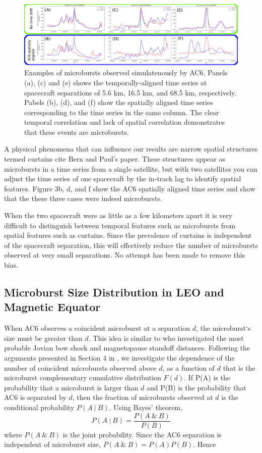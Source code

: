 \documentclass[draft]{agujournal2019}
\begin{document}
\begin{figure}
\includegraphics[width=\textwidth]{fig2.png}
\caption{Examples of microbursts observed simulatenously by AC6. Panels (a), (c) and (e) shows the temporally-aligned time series at spacecraft separations of 5.6 km, 16.5 km, and 68.5 km, respectively. Pabels (b), (d), and (f) show the spatially aligned time series corresponding to the time series in the same column. The clear temporal correlation and lack of spatial correlation demonstrates that these events are microbursts.} \label{fig2}
\end{figure}
	
A physical phenomena that can influence our results are narrow spatial structures termed curtains cite Bern and Paul’s paper. These structures appear as microbursts in a time series from a single satellite, but with two satellites you can adjust the time series of one spacecraft by the in-track lag to identify spatial features. Figure 3b, d, and f show the AC6 spatially aligned time series and show that the these three cases were indeed microbursts.  
	
When the two spacecraft were as little as a few kilometers apart it is very difficult to distinguish between temporal features such as microbursts from spatial features such as curtains. Since the prevalence of curtains is independent of the spacecraft separation, this will effectively reduce the number of microbursts observed at very small separations. No attempt has been made to remove this bias.

\subsection{Microburst Size Distribution in LEO and Magnetic Equator}
When AC6 observes a coincident microburst at a separation $d$, the microburst`s size must be greater than $d$. This idea is similar to  who investigated the most probable Jovian bow shock and magnetopause standoff distances. Following the arguments presented in Section 4 in , we investigate the dependence of the number of coincident microbursts observed above $d$, as a function of $d$ that is the microburst complementary cumulative distribution $F(d)$.  If P(A) is the probability that a microburst is larger than $d$ and P(B) is the probability that AC6 is separated by $d$, then the fraction of microbursts observed at $d$ is the conditional probability $P(A \ \vert \ B)$. Using Bayes’ theorem, 
\begin{equation}
P(A \ \vert \ B) = \frac{P(A \ \& \ B)}{P(B)}
\end{equation} where $P(A \ \& \ B)$ is the joint probability. Since the AC6 separation is independent of microburst size, $P(A \ \& \ B) = P(A)P(B)$. Hence
\end{document}
